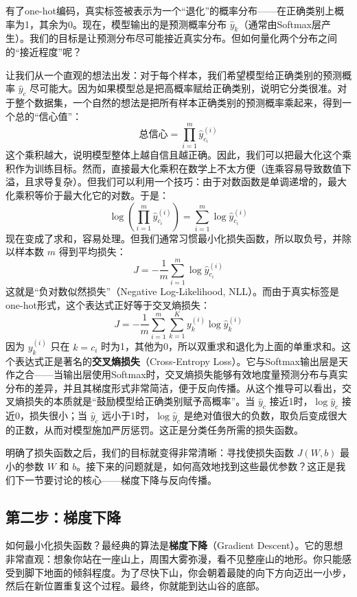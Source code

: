 \documentclass[lang=cn,zihao=-4,a4paper,fontset=windows]{beautybook}
\begin{document}
有了one-hot编码，真实标签被表示为一个“退化”的概率分布——在正确类别上概率为1，其余为0。现在，模型输出的是预测概率分布 $\hat{y}_k$（通常由Softmax层产生）。我们的目标是让预测分布尽可能接近真实分布。但如何量化两个分布之间的“接近程度”呢？

让我们从一个直观的想法出发：对于每个样本，我们希望模型给正确类别的预测概率 $\hat{y}_c$ 尽可能大。因为如果模型总是把高概率赋给正确类别，说明它分类很准。对于整个数据集，一个自然的想法是把所有样本正确类别的预测概率乘起来，得到一个总的“信心值”：
\[\text{总信心} = \prod_{i=1}^{m} \hat{y}_{c_i}^{(i)}\]
这个乘积越大，说明模型整体上越自信且越正确。因此，我们可以把最大化这个乘积作为训练目标。然而，直接最大化乘积在数学上不太方便（连乘容易导致数值下溢，且求导复杂）。但我们可以利用一个技巧：由于对数函数是单调递增的，最大化乘积等价于最大化它的对数。于是：
\[\log\left( \prod_{i=1}^{m} \hat{y}_{c_i}^{(i)} \right) = \sum_{i=1}^{m} \log \hat{y}_{c_i}^{(i)}\]
现在变成了求和，容易处理。但我们通常习惯最小化损失函数，所以取负号，并除以样本数 $m$ 得到平均损失：
\[J = -\frac{1}{m} \sum_{i=1}^{m} \log \hat{y}_{c_i}^{(i)}\]
这就是“负对数似然损失”（Negative Log-Likelihood, NLL）。而由于真实标签是one-hot形式，这个表达式正好等于交叉熵损失：
\[J = -\frac{1}{m} \sum_{i=1}^{m} \sum_{k=1}^{K} y_k^{(i)} \log \hat{y}_k^{(i)}\]
因为 $y_k^{(i)}$ 只在 $k=c_i$ 时为1，其他为0，所以双重求和退化为上面的单重求和。这个表达式正是著名的\textbf{交叉熵损失}（Cross-Entropy Loss）。它与Softmax输出层是天作之合——当输出层使用Softmax时，交叉熵损失能够有效地度量预测分布与真实分布的差异，并且其梯度形式非常简洁，便于反向传播。从这个推导可以看出，交叉熵损失的本质就是“鼓励模型给正确类别赋予高概率”。当 $\hat{y}_c$ 接近1时，$\log \hat{y}_c$ 接近0，损失很小；当 $\hat{y}_c$ 远小于1时，$\log \hat{y}_c$ 是绝对值很大的负数，取负后变成很大的正数，从而对模型施加严厉惩罚。这正是分类任务所需的损失函数。

\begin{fancybox}
明确了损失函数之后，我们的目标就变得非常清晰：寻找使损失函数 $J(W,b)$ 最小的参数 $W$ 和 $b$。接下来的问题就是，如何高效地找到这些最优参数？这正是我们下一节要讨论的核心——梯度下降与反向传播。
\end{fancybox}

\subsection{第二步：梯度下降}

如何最小化损失函数？最经典的算法是\textbf{梯度下降}（Gradient Descent）。它的思想非常直观：想象你站在一座山上，周围大雾弥漫，看不见整座山的地形。你只能感受到脚下地面的倾斜程度。为了尽快下山，你会朝着最陡的向下方向迈出一小步，然后在新位置重复这个过程。最终，你就能到达山谷的底部。
\end{document}

